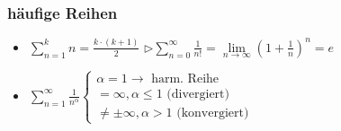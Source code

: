     \subsubsection{häufige Reihen}
        \vspace{0em}
        \begin{itemize}
            \item $\displaystyle \sum_{n=1}^{k} n = \frac{k \cdot (k + 1)}{2} $ \hspace*{0em} $\triangleright \displaystyle \sum_{n=0}^{\infty} \frac{1}{n!} = \lim\limits_{n \rightarrow \infty} \left(1 + \frac{1}{n}\right)^n = e$
            \item $\displaystyle \sum_{n=1}^{\infty} \frac{1}{n^{\alpha}}
            \begin{cases}
                \alpha = 1 \rightarrow \text{ harm. Reihe}\\
                = \infty, \alpha \leq 1 \text{ (divergiert)}\\
                \neq \pm \infty, \alpha > 1 \text{ (konvergiert)}
            \end{cases}
            $
        \end{itemize}
        